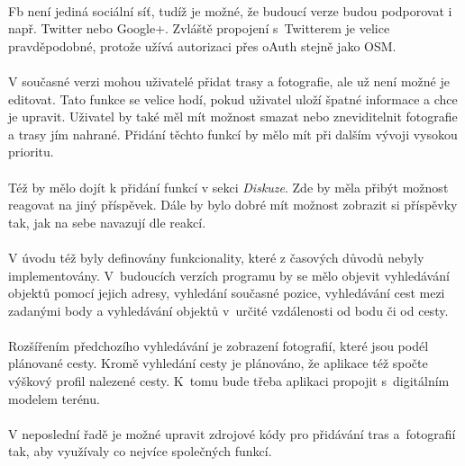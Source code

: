 \documentclass[11pt,a4paper,titlepage,oneside]{book}
\begin{document}
			\paragraph{}\ac{Fb} není jediná sociální síť, tudíž je možné, že budoucí verze budou podporovat i např. Twitter nebo Google+. Zvláště propojení s~Twitterem je velice pravděpodobné, protože užívá autorizaci přes oAuth stejně jako \acl{OSM}.
			\paragraph{}V současné verzi mohou uživatelé přidat trasy a fotografie, ale už není možné je editovat. Tato funkce se velice hodí, pokud uživatel uloží špatné informace a chce je upravit. Uživatel by také měl mít možnost smazat nebo zneviditelnit fotografie a trasy jím nahrané. Přidání těchto funkcí by mělo mít při dalším vývoji vysokou prioritu.
			\paragraph{}Též by mělo dojít k přidání funkcí v sekci \textit{Diskuze}. Zde by měla přibýt možnost reagovat na jiný příspěvek. Dále by bylo dobré mít možnost zobrazit si příspěvky tak, jak na sebe navazují dle reakcí.
			\paragraph{}V úvodu též byly definovány funkcionality, které z časových důvodů nebyly implementovány. V~budoucích verzích programu by se mělo objevit vyhledávání objektů pomocí jejich adresy, vyhledání současné pozice, vyhledávání cest mezi zadanými body a vyhledávání objektů v~určité vzdálenosti od bodu či od cesty. 
			\paragraph{}Rozšířením předchozího vyhledávání je zobrazení fotografií, které jsou podél plánované cesty. Kromě vyhledání cesty je plánováno, že aplikace též spočte výškový profil nalezené cesty. K~tomu bude třeba aplikaci propojit s~digitálním modelem terénu.
			\paragraph{}V neposlední řadě je možné upravit zdrojové kódy pro přidávání tras a~fotografií tak, aby využívaly co nejvíce společných funkcí.

\end{document}
